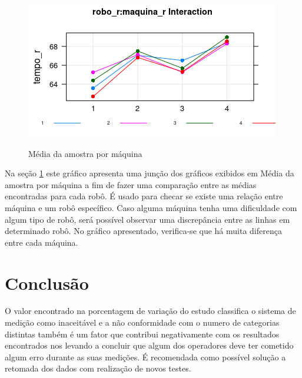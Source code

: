 \documentclass[
12pt,					%
openright,				%
oneside,				%
a4paper,				%
english,
brazil
]{ABNT/abntex2_report}
\begin{document}
\begin{figure}[H]
	\centering
	\caption{Média da amostra por máquina}
	\includegraphics[scale = 0.9]{figures/graf6.png}
	\label{fig:graf6}
\end{figure}

Na seção \ref{fig:graf6} este gráfico apresenta uma junção dos gráficos exibidos em Média da amostra por máquina a fim de fazer uma comparação entre as médias encontradas para cada robô. É usado para checar se existe uma relação entre máquina e um robô específico. Caso alguma máquina tenha uma dificuldade com algum tipo de robô, será possível observar uma discrepância entre as linhas em determinado robô. No gráfico apresentado, verifica-se que há muita diferença entre cada máquina.

\section*{Conclusão}
O valor encontrado na porcentagem de variação do estudo classifica o sistema de medição como inaceitável e a não conformidade com o numero de categorias distintas também é um fator que contribui negativamente com os resultados encontrados nos levando a concluir que algum dos operadores deve ter cometido algum erro durante as suas medições.  É recomendada como possível solução a retomada dos dados com realização de novos testes.
\end{document}
